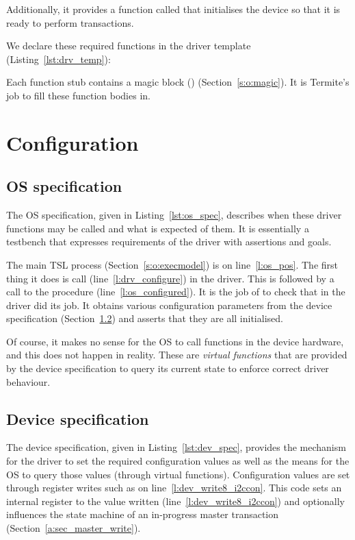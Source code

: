 Additionally, it provides a function called  that initialises the device so that it is ready to perform transactions.

We declare these required functions in the driver template (Listing~\ref{lst:drv_temp}):
\vspace*{5mm}

\vspace*{5mm}

Each function stub contains a magic block () (Section~\ref{s:o:magic}). It is Termite's job to fill these function bodies in.

\section{Configuration}

\subsection{OS specification}

The OS specification, given in Listing~\ref{lst:os_spec}, describes when these driver functions may be called and what is expected of them. It is essentially a testbench that expresses requirements of the driver with assertions and goals.

The main TSL process (Section~\ref{s:o:execmodel}) is on line~\ref{l:os_pos}. The first thing it does is call  (line~\ref{l:drv_configure}) in the driver. This is followed by a call to the procedure  (line~\ref{l:os_configured}). It is the job of  to check that  in the driver did its job. It obtains various configuration parameters from the device specification (Section~\ref{a:sec:dev_spec}) and asserts that they are all initialised. 
        
Of course, it makes no sense for the OS to call functions in the device hardware, and this does not happen in reality. These are \emph{virtual functions} that are provided by the device specification to query its current state to enforce correct driver behaviour. 

\subsection{Device specification}
\label{a:sec:dev_spec}

The device specification, given in Listing~\ref{lst:dev_spec}, provides the mechanism for the driver to set the required configuration values as well as the means for the OS to query those values (through virtual functions). Configuration values are set through register writes such as  on line~\ref{l:dev_write8_i2ccon}. This code sets an internal register to the value written (line~\ref{l:dev_write8_i2ccon}) and optionally influences the state machine of an in-progress master transaction (Section~\ref{a:sec_master_write}). 


